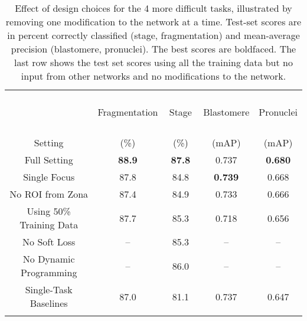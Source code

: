 
\begin{table}
\centering
\caption{
    Effect of design choices for the 4 more difficult tasks, illustrated
    by removing one modification to the network at a time. Test-set
    scores are in percent correctly classified (stage, fragmentation)
    and mean-average precision (blastomere, pronuclei). The best scores
    are boldfaced. The last row shows the test set scores using all the
    training data but no input from other networks and no
    modifications to the network.
}
\label{table:ablation}
\begin{tabular}{c|c|c|c|c}
\hline
 & Fragmentation & \, Stage \, & Blastomere & Pronuclei \\
Setting & (\%) & (\%) & (mAP) & (mAP)\\
\hline
\hline
Full Setting            & \textbf{88.9} & \textbf{87.8} & 0.737     & \textbf{0.680} \\ \hline
Single Focus            &  87.8         & 84.8          & \textbf{0.739}    & 0.668 \\ \hline
No ROI from Zona        &  87.4         & 84.9          & 0.733             & 0.666 \\ \hline
Using 50\% Training Data & 87.7        & 85.3          & 0.718             & 0.656 \\ \hline
No Soft Loss            &  --           & 85.3          & --                & --    \\ \hline
No Dynamic Programming  &  --           & 86.0          & --                & --    \\ \hline \hline
Single-Task Baselines      & 87.0  & 81.1  & 0.737  & 0.647 \\
                        & \cite{szegedy2016rethinking} & \cite{xie2017aggregated} & \cite{he2017mask} & \cite{he2017mask} \\ \hline
\end{tabular}
\end{table}




